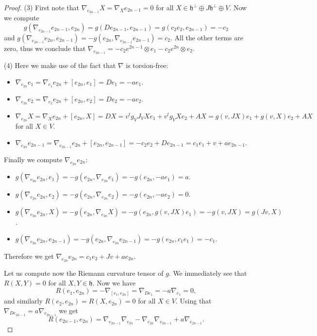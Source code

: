 \documentclass{article}
\theoremstyle{definition}
\newcommand{\frh}{\mathfrak{h}}
\begin{document}
\begin{proof}
    (3) First note that $\nabla_{e_{2n-1}}X=\nabla_Xe_{2n-1}=0$ for all $X\in\frh^\perp\oplus J\frh^\perp\oplus V$. Now we compute $$g(\nabla_{e_{2n-1}}e_{2n-1},e_{2n})=g(De_{2n-1},e_{2n-1})=g(c_2e_2,e_{2n-1})=-c_2$$ and $g(\nabla_{e_{2n-1}}e_{2n},e_{2n-1})=-g(e_{2n},\nabla_{e_{2n-1}}e_{2n-1})=c_2$. All the other terms are zero, thus we conclude that $\nabla_{e_{2n-1}}=-c_2e^{2n-1}\otimes e_1-c_2e^{2n}\otimes e_2$.\medskip

    (4) Here we make use of the fact that $\nabla$ is torsion-free: \begin{itemize}
        \item $\nabla_{e_{2n}}e_1=\nabla_{e_1}e_{2n}+[e_{2n},e_1]=De_1=-ae_1$.
        \item $\nabla_{e_{2n}}e_2=\nabla_{e_2}e_{2n}+[e_{2n},e_2]=De_2=-ae_2$.
        \item $\nabla_{e_{2n}}X=\nabla_Xe_{2n}+[e_{2n},X]=DX=v^tg_VJ_VXe_1+v^tg_VXe_2+AX=g(v,JX)e_1+g(v,X)e_2+AX$ for all $X\in V$.
        \item $\nabla_{e_{2n}}e_{2n-1}=\nabla_{e_{2n-1}}e_{2n}+[e_{2n},e_{2n-1}]=-c_2e_2+De_{2n-1}=c_1e_1+v+ae_{2n-1}$.
    \end{itemize}

    Finally we compute $\nabla_{e_{2n}}e_{2n}$: \begin{itemize}
        \item $g(\nabla_{e_{2n}}e_{2n},e_1)=-g(e_{2n},\nabla_{e_{2n}}e_1)=-g(e_{2n},-ae_1)=a$.
        \item $g(\nabla_{e_{2n}}e_{2n},e_2)=-g(e_{2n},\nabla_{e_{2n}}e_2)=-g(e_{2n},-ae_2)=0$.
        \item $g(\nabla_{e_{2n}}e_{2n},X)=-g(e_{2n},\nabla_{e_{2n}}X)=-g(e_{2n},g(v,JX)e_1)=-g(v,JX)=g(Jv,X)$.
        \item $g(\nabla_{e_{2n}}e_{2n},e_{2n-1})=-g(e_{2n},\nabla_{e_{2n}}e_{2n-1})=-g(e_{2n},c_1e_1)=-c_1$.
    \end{itemize}

    Therefore we get $\nabla_{e_{2n}}e_{2n}=c_1e_2+Jv+ae_{2n}$.\medskip
    
    Let us compute now the Riemann curvature tensor of $g$. We immediately see that $R(X,Y)=0$ for all $X,Y\in\frh$. Now we have $$R(e_1,e_{2n})=-\nabla_{[e_1,e_{2n}]}=\nabla_{De_1}=-a\nabla_{e_1}=0,$$ and similarly $R(e_2,e_{2n})=R(X,e_{2n})=0$ for all $X\in V$. Using that $\nabla_{De_{2n-1}}=a\nabla_{e_{2n-1}}$ we get $$R(e_{2n-1},e_{2n})=\nabla_{e_{2n-1}}\nabla_{e_{2n}}-\nabla_{e_{2n}}\nabla_{e_{2n-1}}+a\nabla_{e_{2n-1}}.$$


\end{proof}
\end{document}
